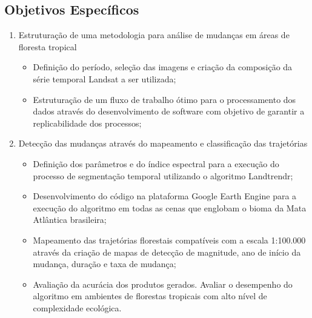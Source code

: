 \subsection*{Objetivos Específicos}
\begin{enumerate}

    \item Estruturação de uma metodologia para análise de mudanças em áreas de floresta tropical
    
    \begin{itemize}
        \item Definição do período, seleção das imagens e criação da composição da série temporal Landsat a ser utilizada;
        
        \item Estruturação de um fluxo de trabalho ótimo para o processamento dos dados através do desenvolvimento de software com objetivo de garantir a replicabilidade dos processos;
        
    \end{itemize}
    
    \item Detecção das mudanças através do mapeamento e classificação das trajetórias
    
    \begin{itemize}
        \item Definição dos parâmetros e do índice espectral para a execução do processo de segmentação temporal utilizando o algoritmo Landtrendr;
        
        \item Desenvolvimento do código na plataforma Google Earth Engine para a execução do algoritmo em todas as cenas que englobam o bioma da Mata Atlântica brasileira;
        
        \item Mapeamento das trajetórias florestais compatíveis com a escala 1:100.000 através da criação de mapas de detecção de magnitude, ano de início da mudança, duração e taxa de mudança;
        
        \item Avaliação da acurácia dos produtos gerados. Avaliar o desempenho do algoritmo em ambientes de florestas tropicais com alto nível de complexidade ecológica.
    \end{itemize}
    

\end{enumerate}
